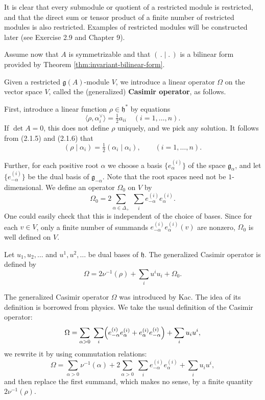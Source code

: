 \documentclass[12pt]{article}
\begin{document}
It is clear that every submodule or quotient of a restricted module is restricted, and that the direct sum or tensor product of a finite number of restricted modules is also restricted. Examples of restricted modules will be constructed later (see Exercise 2.9 and Chapter 9).

Assume now that $A$ is symmetrizable and that $(\,.\mid.\,)$ is a bilinear form provided by Theorem \ref{thm:invariant-bilinear-form}.

Given a restricted $\mathfrak{g}(A)$-module $V$, we introduce a linear operator $\Omega$ on the vector space $V$, called the (generalized) \textbf{Casimir operator}, as follows.

First, introduce a linear function $\rho \in \mathfrak{h}^*$ by equations
\[
    \langle \rho,\alpha_i^\vee \rangle = \tfrac{1}{2}a_{ii} \quad (i=1,\dots,n).
\]
If $\det A=0$, this does not define $\rho$ uniquely, and we pick any solution.
It follows from (2.1.5) and (2.1.6) that
\begin{equation}\label{eq:rho-action}
    (\rho\mid \alpha_i) = \tfrac{1}{2}(\alpha_i\mid \alpha_i), \qquad (i=1,\dots,n).
\end{equation}

Further, for each positive root $\alpha$ we choose a basis $\{e_\alpha^{(i)}\}$ of the space $\mathfrak{g}_\alpha$,
and let $\{e_{-\alpha}^{(i)}\}$ be the dual basis of $\mathfrak{g}_{-\alpha}$. Note that the root spaces need not be $1$-dimensional. We define an operator $\Omega_0$ on $V$ by
\[
    \Omega_0 = 2 \sum_{\alpha\in \Delta_+}\;\sum_i e_{-\alpha}^{(i)}e_\alpha^{(i)}.
\]
One could easily check that this is independent of the choice of bases.
Since for each $v\in V$, only a finite number of summands $e_{-\alpha}^{(i)}e_\alpha^{(i)}(v)$ are nonzero, $\Omega_0$ is well defined on $V$.

Let $u_1,u_2,\dots$ and $u^1,u^2,\dots$ be dual bases of $\mathfrak{h}$.
The generalized Casimir operator is defined by
\[
    \Omega = 2\nu^{-1}(\rho) + \sum_i u^i u_i + \Omega_0.
\]

\begin{remark}
    The generalized Casimir operator $\Omega$ was introduced by Kac. The idea of its definition is borrowed from physics. We take the usual definition of the Casimir operator:
    \[
        \Omega = \sum_{\alpha>0}\;\sum_i
        \Bigl(e_{-\alpha}^{(i)}e_\alpha^{(i)} + e_\alpha^{(i)}e_{-\alpha}^{(i)}\Bigr)
        + \sum_i u_i u^i,
    \]
    we rewrite it by using commutation relations:
    \[
        \Omega = \sum_{\alpha>0} \nu^{-1}(\alpha)
        + 2\sum_{\alpha>0}\;\sum_i e_{-\alpha}^{(i)}e_\alpha^{(i)}
        + \sum_i u_i u^i,
    \]
    and then replace the first summand, which makes no sense, by a finite   quantity $2\nu^{-1}(\rho)$.
\end{remark}
\end{document}
